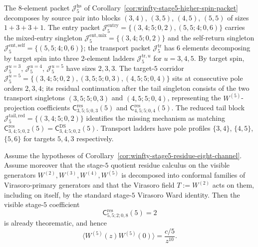\begin{remark}
\label{prop:winfty-stage5-higher-spin-subblocks}%
\label{cor:winfty-stage5-entry-transport}%
\label{cor:winfty-stage5-entry-singletons}%
\label{prop:winfty-stage5-entry-mixed-self}%
\label{prop:winfty-stage5-reduced-tail-singleton}%
\label{prop:winfty-stage5-tail-mechanism}%
\label{prop:winfty-stage5-transport-target-ladders}%
\label{prop:winfty-stage5-higher-spin-target-blocks}%
\label{cor:winfty-stage5-target5-corridor}%
\label{cor:winfty-stage5-target5-residual}%
\label{prop:winfty-stage5-target5-transport-mechanism}%
\label{prop:winfty-stage5-target5-transport-singletons}%
\label{prop:winfty-stage5-transport-pole-profiles}%
\label{rem:winfty-stage5-first-subproblems}%
The $8$-element packet $\mathcal{J}_5^{\mathrm{hs}}$ of
Corollary~\ref{cor:winfty-stage5-higher-spin-packet} decomposes by
source pair into blocks $(3,4)$, $(3,5)$, $(4,5)$, $(5,5)$ of sizes
$1+3+3+1$.  The entry packet
$\mathcal{J}_5^{\mathrm{entry}}=\{(3,4;5;0,2),(5,5;4;0,6)\}$ carries
the mixed-entry singleton $\mathcal{J}_5^{\mathrm{ent,mix}}=\{(3,4;5;0,2)\}$ and the self-return
singleton $\mathcal{J}_5^{\mathrm{ent,self}}=\{(5,5;4;0,6)\}$; the transport packet
$\mathcal{J}_5^{\mathrm{tr}}$ has $6$ elements decomposing by target
spin into three $2$-element ladders $\mathcal{J}_5^{\mathrm{tr},u}$ for
$u=3,4,5$.  By target spin,
$\mathcal{J}_5^{u=3}$, $\mathcal{J}_5^{u=4}$, $\mathcal{J}_5^{u=5}$
have sizes $2,3,3$.  The target-$5$ corridor
$\mathcal{J}_5^{u=5}=\{(3,4;5;0,2),(3,5;5;0,3),(4,5;5;0,4)\}$ sits at
consecutive pole orders $2,3,4$; its residual continuation after the
tail singleton consists of the two transport singletons
$(3,5;5;0,3)$ and $(4,5;5;0,4)$, representing the
$W^{(5)}$-projection coefficients
$\mathsf{C}^{\mathrm{res}}_{3,5;5;0,3}(5)$ and
$\mathsf{C}^{\mathrm{res}}_{4,5;5;0,4}(5)$.  The reduced tail block
$\mathcal{J}_5^{\mathrm{tail,red}}=\{(3,4;5;0,2)\}$ identifies the
missing mechanism as matching
$\mathsf{C}^{\mathrm{res}}_{3,4;5;0,2}(5)=\mathsf{C}^{\mathrm{DS}}_{3,4;5;0,2}(5)$.
Transport ladders have pole profiles $\{3,4\}$, $\{4,5\}$, $\{5,6\}$
for targets $5,4,3$ respectively.
\end{remark}

\begin{proposition}
\label{prop:winfty-stage5-visible-w5-normalization}
Assume the hypotheses of
Corollary~\ref{cor:winfty-stage5-residue-eight-channel}.  Assume
moreover that the stage-$5$ quotient residue calculus on the visible
generators $W^{(2)},W^{(3)},W^{(4)},W^{(5)}$ is decomposed into
conformal families of Virasoro-primary generators and that the
Virasoro field $T:=W^{(2)}$ acts on them, including on itself, by the
standard stage-$5$ Virasoro Ward identity.  Then the visible stage-$5$
coefficient
\[
\mathsf{C}^{\mathrm{res}}_{5,5;2;0,8}(5)=2
\]
is already theorematic, and hence
\[
\langle W^{(5)}(z)W^{(5)}(0)\rangle=\frac{c/5}{z^{10}}.
\]
\end{proposition}

